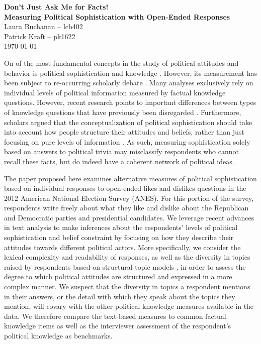 \documentclass[12pt]{article}
\begin{document}
\pagestyle{fancy}

\fancyfoot[C]{\thepage} %
\onehalfspacing

\begin{center}
  {\large\textbf{Don't Just Ask Me for Facts!}}\\
  \textbf{Measuring Political Sophistication with Open-Ended Responses} \\
	Laura Buchanan -- lcb402 \\
	Patrick Kraft -- pk1622 \\
	\today 
\end{center}

On of the most fundamental concepts in the study of political attitudes and behavior is political sophistication and knowledge \citep{converse1964nature,carpini1996americans}. However, its measurement has been subject to re-occurring scholarly debate \citep[e.g.][]{mondak2000reconsidering,mondak2001asked,debell2013harder}. Many analyses exclusively rely on individual levels of political information measured by factual knowledge questions. However, recent research points to important differences between types of knowledge questions that have previously been disregarded \citep{barabas2014question}. Furthermore, scholars argued that the conceptualization of political sophistication should take into account how people structure their attitudes and beliefs, rather than just focusing on pure levels of information \citep[e.g.][]{luskin1987measuring}. As such, measuring sophistication solely based on answers to political trivia may misclassify respondents who cannot recall these facts, but do indeed have a coherent network of political ideas.

The paper proposed here examines alternative measures of political sophistication based on individual responses to open-ended likes and dislikes questions in the 2012 American National Election Survey (ANES). For this portion of the survey, respondents write freely about what they like and dislike about the Republican and Democratic parties and presidential candidates. We leverage recent advances in text analysis to make inferences about the respondents' levels of political sophistication and belief constraint by focusing on how they describe their attitudes towards different political actors. More specifically, we consider the lexical complexity and readability of responses, as well as the diversity in topics raised by respondents based on structural topic models \citep{roberts2014structural}, in order to assess the degree to which political attitudes are structured and expressed in a more complex manner. We suspect that the diversity in topics a respondent mentions in their answers, or the detail with which they speak about the topics they mention, will covary with the other political knowledge measures available in the data. We therefore compare the text-based measures to common factual knowledge items as well as the interviewer assessment of the respondent's political knowledge as benchmarks.
\end{document}
